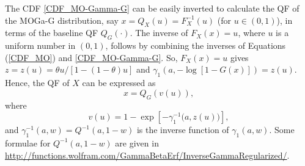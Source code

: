 \documentclass[twoside,leqno,11pt]{article}
\begin{document}
\vspace{0.6cm}

The CDF \eqref{CDF_MO-Gamma-G} can be easily inverted to 
calculate the QF of the MOGa-G distribution, say $x=Q_{X}(u)=F_X^{-1}(u)$ (for $u \in (0,1)$), in terms of 
the baseline QF $Q_G(\cdot)$. The inverse of
$F_{X}(x)=u$, where $u$ is a uniform number in $(0,1)$, 
follows by combining the inverses of Equations (\ref{CDF_MO}) and \eqref{CDF_MO-Gamma-G}. So, $F_{X}(x)=u$ gives 
$z=z(u)=\theta u/[1-(1-\theta)u]$ and $\gamma_{1}\left(a, -\log[1-G(x)]\right)=z(u)$. Hence, the QF of $X$ can be 
expressed as
$$x=Q_G\left(v(u)\right),$$
where
$$v(u)=1-\exp\left[-\gamma_1^{-1}\big(a,z(u)\big)\right],$$
and $\gamma_1^{-1}(a,w)=Q^{-1}(a,1-w)$ is the inverse function of $\gamma_1(a,w)$. Some formulae for
$Q^{-1}(a,1-w)$ are given in \url{http://functions.wolfram.com/GammaBetaErf/InverseGammaRegularized/}.
\end{document}
